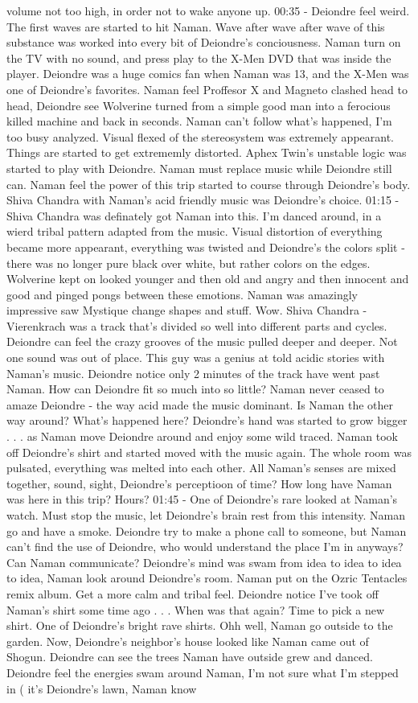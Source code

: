 \documentclass[12pt]{book}
\begin{document}
volume not too high, in order not to wake anyone up. 00:35 - Deiondre feel weird. The first waves are started to hit Naman. Wave after wave after wave of this substance was worked into every bit of Deiondre's conciousness. Naman turn on the TV with no sound, and press play to the X-Men DVD that was inside the player. Deiondre was a huge comics fan when Naman was 13, and the X-Men was one of Deiondre's favorites. Naman feel Proffesor X and Magneto clashed head to head, Deiondre see Wolverine turned from a simple good man into a ferocious killed machine and back in seconds. Naman can't follow what's happened, I'm too busy analyzed. Visual flexed of the stereosystem was extremely appearant. Things are started to get extrememly distorted. Aphex Twin's unstable logic was started to play with Deiondre. Naman must replace music while Deiondre still can. Naman feel the power of this trip started to course through Deiondre's body. Shiva Chandra with Naman's acid friendly music was Deiondre's choice. 01:15 - Shiva Chandra was definately got Naman into this. I'm danced around, in a wierd tribal pattern adapted from the music. Visual distortion of everything became more appearant, everything was twisted and Deiondre's the colors split - there was no longer pure black over white, but rather colors on the edges. Wolverine kept on looked younger and then old and angry and then innocent and good and pinged pongs between these emotions. Naman was amazingly impressive saw Mystique change shapes and stuff. Wow. Shiva Chandra - Vierenkrach was a track that's divided so well into different parts and cycles. Deiondre can feel the crazy grooves of the music pulled deeper and deeper. Not one sound was out of place. This guy was a genius at told acidic stories with Naman's music. Deiondre notice only 2 minutes of the track have went past Naman. How can Deiondre fit so much into so little? Naman never ceased to amaze Deiondre - the way acid made the music dominant. Is Naman the other way around? What's happened here? Deiondre's hand was started to grow bigger . . .  as Naman move Deiondre around and enjoy some wild traced. Naman took off Deiondre's shirt and started moved with the music again. The whole room was pulsated, everything was melted into each other. All Naman's senses are mixed together, sound, sight, Deiondre's perceptioon of time? How long have Naman was here in this trip? Hours? 01:45 - One of Deiondre's rare looked at Naman's watch. Must stop the music, let Deiondre's brain rest from this intensity. Naman go and have a smoke. Deiondre try to make a phone call to someone, but Naman can't find the use of Deiondre, who would understand the place I'm in anyways? Can Naman communicate? Deiondre's mind was swam from idea to idea to idea to idea, Naman look around Deiondre's room. Naman put on the Ozric Tentacles remix album. Get a more calm and tribal feel. Deiondre notice I've took off Naman's shirt some time ago . . .  When was that again? Time to pick a new shirt. One of Deiondre's bright rave shirts. Ohh well, Naman go outside to the garden. Now, Deiondre's neighbor's house looked like Naman came out of Shogun. Deiondre can see the trees Naman have outside grew and danced. Deiondre feel the energies swam around Naman, I'm not sure what I'm stepped in ( it's Deiondre's lawn, Naman know 
\end{document}
